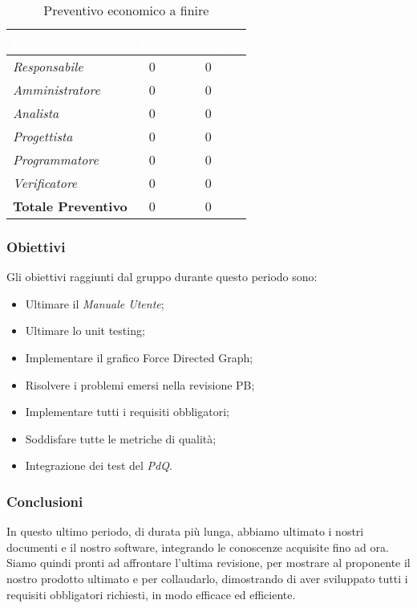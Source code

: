 \begin{table}[H]
    \renewcommand\arraystretch{1.5}
    \centering
    \begin{tabular}{|l|c|c|}
    \hline
    \rowcolor[HTML]{036400}
    \textcolor{white}{\textbf{Ruolo}} & \multicolumn{1}{l|}{\textcolor{white}{\textbf{Ore}}} & \multicolumn{1}{l|}{\textcolor{white}{\textbf{Costo (€)}}} \\ \hline
    \rowcolor[HTML]{EFEFEF}\textit{Responsabile}      & 0           & 0             \\ \hline
    \rowcolor[HTML]{C0C0C0}\textit{Amministratore}    & 0           & 0             \\ \hline
    \rowcolor[HTML]{EFEFEF}\textit{Analista}          & 0           & 0             \\ \hline
    \rowcolor[HTML]{C0C0C0}\textit{Progettista}       & 0           & 0             \\ \hline
    \rowcolor[HTML]{EFEFEF}\textit{Programmatore}     & 0           & 0             \\ \hline
    \rowcolor[HTML]{C0C0C0}\textit{Verificatore}      & 0           & 0             \\ \hline
    \rowcolor[HTML]{EFEFEF}\textbf{Totale Preventivo} & 0           & 0             \\ \hline
    \end{tabular}
    \caption{Preventivo economico a finire}
\end{table}

\subsubsection{Obiettivi}
Gli obiettivi raggiunti dal gruppo durante questo periodo sono:
\begin{itemize}
    \item Ultimare il \textit{Manuale Utente};
    \item Ultimare lo unit testing;
    \item Implementare il grafico Force Directed Graph;
    \item Risolvere i problemi emersi nella revisione PB;
    \item Implementare tutti i requisiti obbligatori;
    \item Soddisfare tutte le metriche di qualità;
    \item Integrazione dei test del \textit{PdQ}.
\end{itemize}

\subsubsection{Conclusioni}
In questo ultimo periodo, di durata più lunga, abbiamo ultimato i nostri documenti e il nostro software, integrando le conoscenze acquisite fino ad ora. Siamo quindi pronti ad affrontare l'ultima revisione, per mostrare al proponente il nostro prodotto ultimato e per collaudarlo, dimostrando di aver sviluppato tutti i requisiti obbligatori richiesti, in modo efficace ed efficiente.